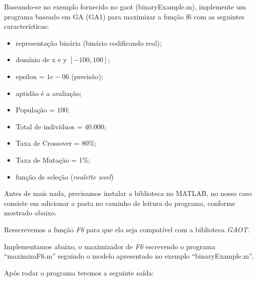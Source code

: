 \documentclass{article}
\begin{document}
\begin{flushleft}
	Baseando-se no exemplo fornecido no gaot (binaryExample.m),
	implemente um programa baseado em GA (GA1) para maximizar a
	função f6 com as seguintes características:

	\begin{itemize}
		\item representação binária (binário codificando real);
		\item domínio de x e y $[-100, 100]$;
		\item epsilon = $1e-06$ (precisão);
		\item aptidão é a avaliação;
		\item População = $100$;
		\item Total de indivíduos = $40.000$;
		\item Taxa de Crossover = 80\%;
		\item Taxa de Mutação = 1\%;
		\item função de seleção (\emph{roulette weel})
	\end{itemize}

	Antes de mais nada, precisamos instalar a biblioteca no
	MATLAB\cite{MATLAB:2020b}, no nosso caso consiste em
	adicionar a pasta no caminho de leitura do programa,
	conforme mostrado abaixo.
\end{flushleft}



\begin{flushleft}
	Reescrevemos a função \emph{F6} para que ela seja compatível
	com a biblioteca \emph{GAOT}.
\end{flushleft}



\begin{flushleft}
	Implementamos abaixo, o maximizador de \emph{F6} escrevendo
	o programa ``maximizaF6.m'' seguindo o modelo apresentado no
	exemplo ``binaryExample.m''.
\end{flushleft}



\begin{flushleft}
	Após rodar o programa teremos a seguinte saída:
\end{flushleft}
\end{document}
